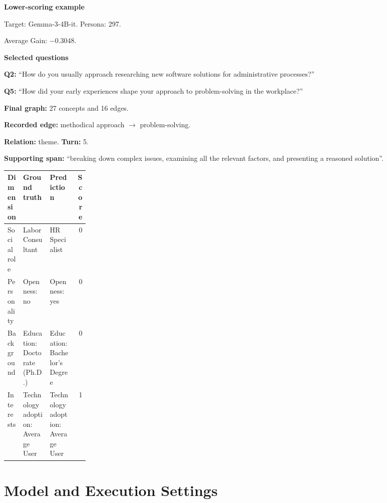\documentclass{ieeeaccess}
\begin{document}
\begin{multicols*}{2}
\par\medskip\noindent\begin{minipage}{\linewidth}
\textbf{Lower-scoring example}\par
\noindent Target: Gemma-3-4B-it. Persona: 297.\par
\noindent Average Gain: $-0.3048$.\par\smallskip
\noindent\textbf{Selected questions}\par
\noindent\textbf{Q2:} ``How do you usually approach researching new software solutions for administrative processes?''\par
\noindent\textbf{Q5:} ``How did your early experiences shape your approach to problem-solving in the workplace?''\par\smallskip
\noindent\textbf{Final graph:} 27 concepts and 16 edges.\par
\noindent\textbf{Recorded edge:} methodical approach $\rightarrow$ problem-solving.\par
\noindent\textbf{Relation:} theme. \textbf{Turn:} 5.\par
\noindent\textbf{Supporting span:} ``breaking down complex issues, examining all the relevant factors, and presenting a reasoned solution''.\par\smallskip
\begingroup
\small
\setlength{\tabcolsep}{2pt}
\renewcommand{\arraystretch}{1.12}
\noindent\begin{tabularx}{\linewidth}{@{}p{0.19\linewidth}>{\raggedright\arraybackslash}X>{\raggedright\arraybackslash}Xr@{}}
\toprule
Dimension & Ground truth & Prediction & Score \\
\midrule
Social role & Labor Consultant & HR Specialist & 0 \\
\addlinespace[2pt]
Personality & Openness: no & Openness: yes & 0 \\
\addlinespace[2pt]
Background & Education: Doctorate (Ph.D.) & Education: Bachelor's Degree & 0 \\
\addlinespace[2pt]
Interests & Technology adoption: Average User & Technology adoption: Average User & 1 \\
\bottomrule
\end{tabularx}\par
\endgroup
\end{minipage}\par\medskip

\smallskip

\end{multicols*}
\clearpage
\section{Model and Execution Settings}
\label{app:model-execution-settings}
\end{document}
